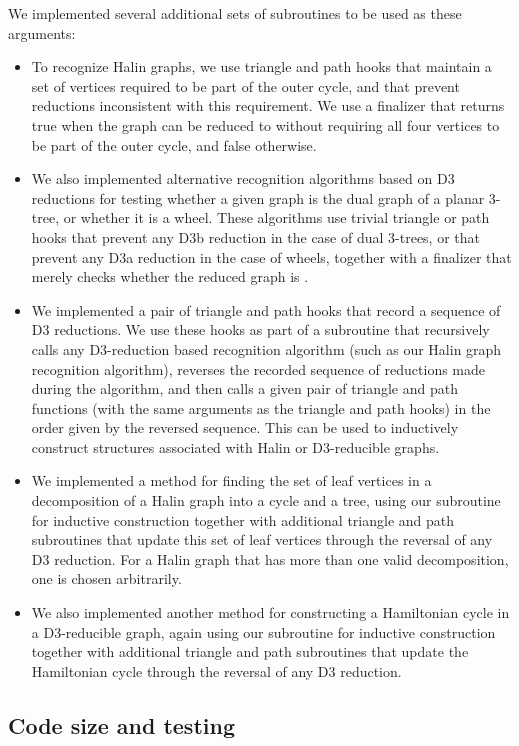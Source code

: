 \documentclass{article}
\begin{document}
\noindent
We  implemented several additional sets of subroutines to be used as these arguments:
\begin{itemize}
\item To recognize Halin graphs, we use triangle and path hooks that maintain a set of vertices required to be part of the outer cycle, and that prevent reductions inconsistent with this requirement.
We use a finalizer that returns true when the graph can be reduced to  without requiring all four vertices to be part of the outer cycle, and false otherwise.
\item We also implemented alternative recognition algorithms based on D3 reductions for testing whether a given graph is the dual graph of a planar 3-tree, or whether it is a wheel. These algorithms use trivial triangle or path hooks that prevent any D3b reduction in the case of dual 3-trees, or that prevent any D3a reduction in the case of wheels, together with a finalizer that merely checks whether the reduced graph is .
\item We implemented a pair of triangle and path hooks that record a sequence of D3 reductions. We use these hooks as part of a subroutine that recursively calls any D3-reduction based recognition algorithm (such as our Halin graph recognition algorithm), reverses the recorded sequence of reductions made during the algorithm, and then calls a given pair of triangle and path functions (with the same arguments as the triangle and path hooks) in the order given by the reversed sequence. This can be used to inductively construct structures associated with Halin or D3-reducible graphs.
\item We implemented a method for finding the set of leaf vertices in a decomposition of a Halin graph into a cycle and a tree, using our subroutine for inductive construction together with additional triangle and path subroutines that update this set of leaf vertices through the reversal of any D3 reduction. For a Halin graph that has more than one valid decomposition, one is chosen arbitrarily.
\item We also implemented another method for constructing a Hamiltonian cycle in a D3-reducible graph, again using our subroutine for inductive construction together with additional triangle and path subroutines that update the Hamiltonian cycle through the reversal of any D3 reduction.
\end{itemize}

\subsection{Code size and testing}
\end{document}
